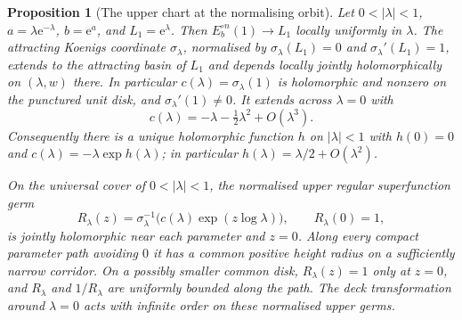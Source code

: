 \documentclass[11pt,a4paper]{article}
\newtheorem{proposition}[theorem]{Proposition}
\theoremstyle{definition}
\newcommand{\eee}{\mathrm{e}}
\begin{document}
\begin{proposition}[The upper chart at the normalising orbit]
\label{prop:upper-orbit}
Let $0<|\lambda|<1$, $a=\lambda\eee^{-\lambda}$,
$b=\eee^a$, and $L_1=\eee^\lambda$.  Then
$E_b^{\circ n}(1)\to L_1$ locally uniformly in $\lambda$.
The attracting Koenigs coordinate $\sigma_\lambda$, normalised by
$\sigma_\lambda(L_1)=0$ and $\sigma_\lambda'(L_1)=1$, extends to the
attracting basin of $L_1$ and depends locally jointly holomorphically
on $(\lambda,w)$ there.  In particular
$c(\lambda)=\sigma_\lambda(1)$ is holomorphic and nonzero on the
punctured unit disk, and $\sigma_\lambda'(1)\ne0$.  It extends across
$\lambda=0$ with
\[
 c(\lambda)=-\lambda-\tfrac12\lambda^2+O(\lambda^3).
\]
Consequently there is a unique holomorphic function $h$ on $|\lambda|<1$
with $h(0)=0$ and $c(\lambda)=-\lambda\exp h(\lambda)$; in particular
$h(\lambda)=\lambda/2+O(\lambda^2)$.

On the universal cover of $0<|\lambda|<1$, the normalised upper regular
superfunction germ
\[
 R_\lambda(z)=\sigma_\lambda^{-1}
       \bigl(c(\lambda)\exp(z\log\lambda)\bigr),
 \qquad R_\lambda(0)=1,
\]
is jointly holomorphic near each parameter and $z=0$.  Along every
compact parameter path avoiding $0$ it has a common positive
height radius on a sufficiently narrow corridor.  On a possibly
smaller common disk, $R_\lambda(z)=1$ only at $z=0$, and
$R_\lambda$ and $1/R_\lambda$ are uniformly bounded along the path.
The deck transformation around $\lambda=0$ acts with infinite order on
these normalised upper germs.
\end{proposition}
\end{document}

